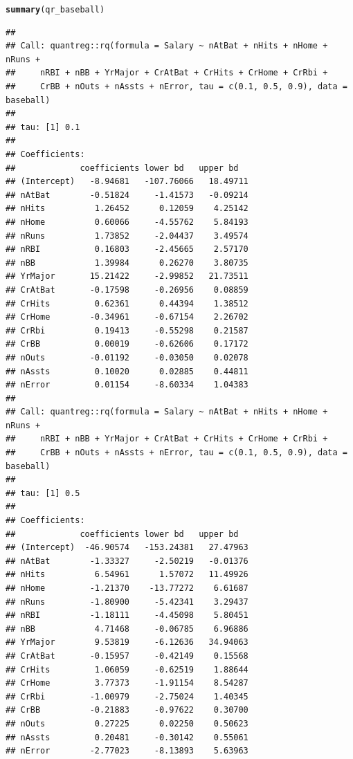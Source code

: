 \documentclass{article}\usepackage[]{graphicx}\usepackage[]{color}
\makeatletter
\newcommand{\hlstd}[1]{\textcolor[rgb]{0.345,0.345,0.345}{#1}}%
\newcommand{\hlkwd}[1]{\textcolor[rgb]{0.737,0.353,0.396}{\textbf{#1}}}%
\newenvironment{kframe}{%
 \def\at@end@of@kframe{}%
 \ifinner\ifhmode%
  \def\at@end@of@kframe{\end{minipage}}%
  \begin{minipage}{\columnwidth}%
 \fi\fi%
 \def\FrameCommand##1{\hskip\@totalleftmargin \hskip-\fboxsep
 \colorbox{shadecolor}{##1}\hskip-\fboxsep
     \hskip-\linewidth \hskip-\@totalleftmargin \hskip\columnwidth}%
 \MakeFramed {\advance\hsize-\width
   \@totalleftmargin\z@ \linewidth\hsize
   \@setminipage}}%
 {\par\unskip\endMakeFramed%
 \at@end@of@kframe}
\newenvironment{knitrout}{}{} %
\makeatother
\begin{document}
\begin{knitrout}
\color{fgcolor}\begin{kframe}
\begin{alltt}
\hlkwd{summary}\hlstd{(qr_baseball)}
\end{alltt}
\begin{verbatim}
## 
## Call: quantreg::rq(formula = Salary ~ nAtBat + nHits + nHome + nRuns + 
##     nRBI + nBB + YrMajor + CrAtBat + CrHits + CrHome + CrRbi + 
##     CrBB + nOuts + nAssts + nError, tau = c(0.1, 0.5, 0.9), data = baseball)
## 
## tau: [1] 0.1
## 
## Coefficients:
##             coefficients lower bd   upper bd  
## (Intercept)   -8.94681   -107.76066   18.49711
## nAtBat        -0.51824     -1.41573   -0.09214
## nHits          1.26452      0.12059    4.25142
## nHome          0.60066     -4.55762    5.84193
## nRuns          1.73852     -2.04437    3.49574
## nRBI           0.16803     -2.45665    2.57170
## nBB            1.39984      0.26270    3.80735
## YrMajor       15.21422     -2.99852   21.73511
## CrAtBat       -0.17598     -0.26956    0.08859
## CrHits         0.62361      0.44394    1.38512
## CrHome        -0.34961     -0.67154    2.26702
## CrRbi          0.19413     -0.55298    0.21587
## CrBB           0.00019     -0.62606    0.17172
## nOuts         -0.01192     -0.03050    0.02078
## nAssts         0.10020      0.02885    0.44811
## nError         0.01154     -8.60334    1.04383
## 
## Call: quantreg::rq(formula = Salary ~ nAtBat + nHits + nHome + nRuns + 
##     nRBI + nBB + YrMajor + CrAtBat + CrHits + CrHome + CrRbi + 
##     CrBB + nOuts + nAssts + nError, tau = c(0.1, 0.5, 0.9), data = baseball)
## 
## tau: [1] 0.5
## 
## Coefficients:
##             coefficients lower bd   upper bd  
## (Intercept)  -46.90574   -153.24381   27.47963
## nAtBat        -1.33327     -2.50219   -0.01376
## nHits          6.54961      1.57072   11.49926
## nHome         -1.21370    -13.77272    6.61687
## nRuns         -1.80900     -5.42341    3.29437
## nRBI          -1.18111     -4.45098    5.80451
## nBB            4.71468     -0.06785    6.96886
## YrMajor        9.53819     -6.12636   34.94063
## CrAtBat       -0.15957     -0.42149    0.15568
## CrHits         1.06059     -0.62519    1.88644
## CrHome         3.77373     -1.91154    8.54287
## CrRbi         -1.00979     -2.75024    1.40345
## CrBB          -0.21883     -0.97622    0.30700
## nOuts          0.27225      0.02250    0.50623
## nAssts         0.20481     -0.30142    0.55061
## nError        -2.77023     -8.13893    5.63963

\end{verbatim}
\end{kframe}
\end{knitrout}
\end{document}

